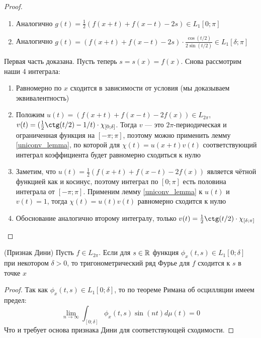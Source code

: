 \begin{proof}
\begin{enumerate}
 		\item Аналогично $g(t) = \frac{1}{2}(f(x + t) + f(x - t) - 2s) \in L_1[0; \pi]$
 		
 		\item Аналогично $g(t) = (f(x + t) + f(x - t) - 2s) \cdot \frac{\cos(t / 2)}{2\sin(t / 2)} \in L_1[\delta; \pi]$
 	\end{enumerate}
    Первая часть доказана. Пусть теперь $s = s(x) = f(x)$. Снова рассмотрим наши 4 интеграла:
    \begin{enumerate}
    	\item Равномерно по $x$ сходится в зависимости от условия (мы доказываем эквивалентность)
    	
    	\item Положим $u(t) = (f(x + t) + f(x - t) - 2f(x)) \in L_{2\pi}$, $v(t) = (\frac{1}{2}\ctg(t / 2) - 1 / t) \cdot \chi_{[0; \delta]}$. Тогда $v$ --- это $2\pi$-периодическая и ограниченная функция на $[-\pi; \pi]$, поэтому можно применить лемму \ref{uniconv_lemma}, по которой для $\chi(t) = u(x + t)v(t)$ соответствующий интеграл коэффициента будет равномерно сходиться к нулю
    	
    	\item Заметим, что $u(t) = \frac{1}{2}(f(x + t) + f(x - t) - 2f(x))$ является чётной функцией как и косинус, поэтому интеграл по $[0; \pi]$ есть половина интеграла от $[-\pi; \pi]$. Применим лемму \ref{uniconv_lemma} к $u(t)$ и $v(t) = 1$, тогда $\chi(t) = u(t)v(t)$ равномерно сходится к нулю
    	
    	\item Обоснование аналогично второму интегралу, только $v(t) = \frac{1}{2}\ctg(t / 2) \cdot \chi_{[\delta; \pi]}$
    \end{enumerate}
\end{proof}

\begin{theorem} (Признак Дини)
	Пусть $f \in L_{2\pi}$. Если для $s \in \mathbb{R}$ функция $\phi_x(t, s) \in L_1[0; \delta]$ при некотором $\delta > 0$, то тригонометрический ряд Фурье для $f$ сходится к $s$ в точке $x$
\end{theorem}

\begin{proof}
	Так как $\phi_x(t, s) \in L_1[0; \delta]$, то по теореме Римана об осцилляции имеем предел:
	\[
		\lim_{n \to \infty} \int_{[0; \delta]} \phi_x(t, s)\sin(nt)d\mu(t) = 0
	\]
	Что и требует основа признака Дини для соответствующей сходимости.
\end{proof}